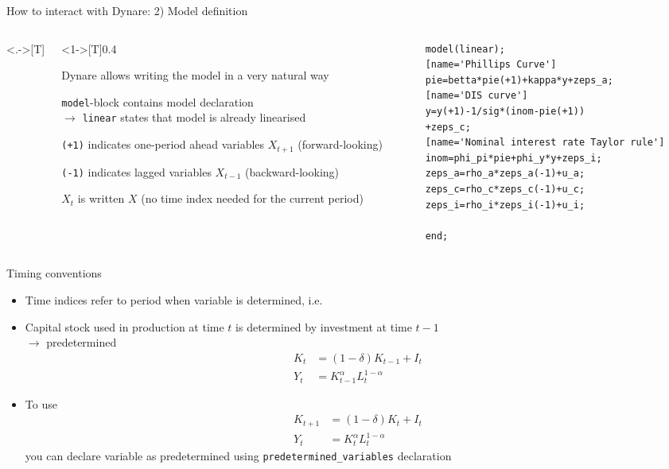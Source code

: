 \documentclass[handout,usepdftitle=false,xcolor=dvipsnames,aspectratio=169]{beamer}
\begin{document}
\begin{frame}[fragile]{How to interact with Dynare: 2) Model definition}
\begin{columns}<.->[T] %
\begin{column}<1->[T]{0.4\textwidth}
	    \begin{witemize}
	        \item Dynare allows writing the model in a very natural way
	        \item \texttt{model}-block contains model declaration\\
            $\rightarrow$ \texttt{linear} states that model is already linearised
	        \item \texttt{(+1)} indicates one-period ahead variables $X_{t+1}$ (forward-looking)
	        \item \texttt{(-1)} indicates lagged variables $X_{t-1}$ (backward-looking)
            \item $X_t$ is written $X$ (no time index needed for the current period)
	    \end{witemize}
\end{column}
\begin{column}[T]{0.6\textwidth}
\begin{verbatim}
model(linear);
[name='Phillips Curve']
pie=betta*pie(+1)+kappa*y+zeps_a;
[name='DIS curve']
y=y(+1)-1/sig*(inom-pie(+1))
+zeps_c;
[name='Nominal interest rate Taylor rule']
inom=phi_pi*pie+phi_y*y+zeps_i;
zeps_a=rho_a*zeps_a(-1)+u_a;
zeps_c=rho_c*zeps_c(-1)+u_c;
zeps_i=rho_i*zeps_i(-1)+u_i;

end;
\end{verbatim}
\end{column}
\end{columns}
\end{frame}

\begin{frame}{Timing conventions}
\begin{itemize}
	\item Time indices refer to period when variable is determined, i.e.\ 
	\item Capital stock used in production at time $t$ is determined by investment at time $t-1$\\
$\rightarrow$ predetermined
	\begin{align}
	K_t&=(1-\delta)K_{t-1}+I_t\\
	Y_t&=K_{t-1}^\alpha L_t^{1-\alpha}
	\end{align}
	\item To use 
	\begin{align}
	K_{t+1}&=(1-\delta)K_{t}+I_t\\
	Y_t&=K_{t}^\alpha L_t^{1-\alpha}
	\end{align}
	you can declare variable as predetermined using \texttt{predetermined\_variables} declaration
\end{itemize}
\end{frame}
\end{document}
